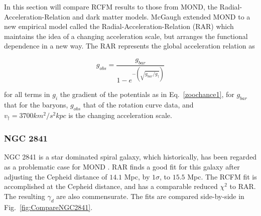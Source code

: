 \documentclass[reprint,%
 amsmath,amssymb,
 aps,
]{revtex4-1}
\begin{document}
   In this section will  
   compare RCFM   results to those from MOND, the Radial-Acceleration-Relation and dark matter models. 
   McGaugh extended MOND to a new empirical model called the Radial-Acceleration-Relation (RAR)  which maintains the idea of a changing acceleration scale, but arranges the functional dependence in a new way. The RAR represents the  global acceleration relation as
   
\begin{equation}
    g_{obs}=\frac{g_{bar}}{1-e^{-(\sqrt{g_{bar}/g_\dagger})}}
    \label{Eq:RAR}
\end{equation}

for all  terms in $g_i$   the gradient of the potentials as in Eq.~\ref{zoochance1}, for 
$ g_{bar}  $ that for   the baryons,    $g_{obs} $  that of   the rotation curve data, and   $v_\dagger = 3700 km^2/ s^2 kpc$  is the changing acceleration scale.  

 
 
 
\subsubsection{NGC 2841}

NGC 2841 is a star dominated spiral galaxy, which   historically, has been regarded as a problematic case for MOND  \citet{Gent}.   RAR   finds a good  fit for this galaxy    after adjusting
the Cepheid   distance of $14.1$ Mpc,  by $1\sigma$,  to $15.5$ Mpc. The RCFM fit is accomplished at the Cepheid distance, 
and has a comparable reduced $\chi^2$ to RAR. The resulting $\gamma_d$   are also commensurate.   The fits are compared side-by-side in  Fig.~\ref{fig:CompareNGC2841}. 
\end{document}
